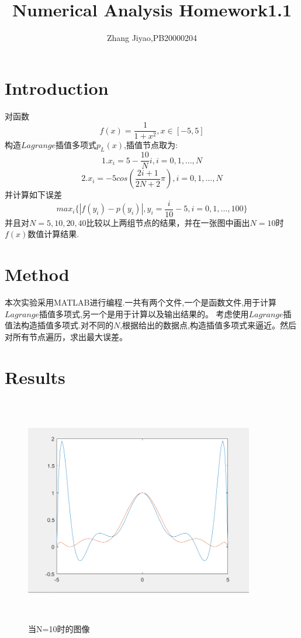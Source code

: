 \documentclass{article}
\title{Numerical Analysis Homework1.1}
\author{Zhang Jiyao,PB20000204}
\begin{document}
	\maketitle
	
	\section{Introduction}
	对函数
	$$f(x)=\frac{1}{1+x^2},x\in [-5,5]$$
	构造$Lagrange$插值多项式$p_L(x)$,插值节点取为:
	$$1.x_i=5-\frac{10}{N}i,i=0,1,...,N$$
	$$2.x_i=-5cos(\frac{2i+1}{2N+2}\pi),i=0,1,...,N$$
	并计算如下误差
	$$max_i\{\left|f(y_i)-p(y_i)\right|,y_i=\frac{i}{10}-5,i=0,1,...,100\}$$
	并且对$N=5,10,20,40$比较以上两组节点的结果，并在一张图中画出$N=10$时$f(x)$数值计算结果.
	
	
    \section{Method}
    本次实验采用MATLAB进行编程.一共有两个文件,一个是函数文件,用于计算$Lagrange$插值多项式,另一个是用于计算以及输出结果的。
    考虑使用$Lagrange$插值法构造插值多项式.对不同的$N$,根据给出的数据点,构造插值多项式来逼近。然后对所有节点遍历，求出最大误差。
    
    \section{Results}
    
    	\begin{figure}[p]
    	\begin{center}
    		
    		\includegraphics[width=10cm,height=10cm]{graph}
    		
    		\caption{当N=10时的图像} \label{figure.label}
    	\end{center}
    \end{figure}
\end{document}
